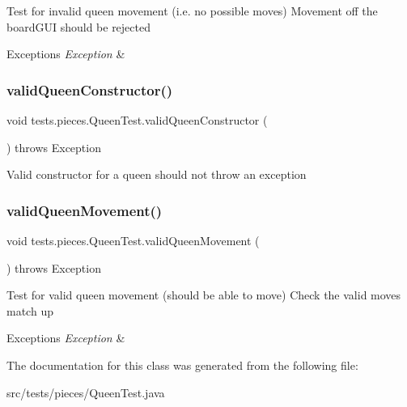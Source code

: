 Test for invalid queen movement (i.\+e. no possible moves) Movement off the board\+G\+UI should be rejected


\begin{DoxyExceptions}{Exceptions}
{\em Exception} & \\
\hline
\end{DoxyExceptions}
\hypertarget{classtests_1_1pieces_1_1_queen_test_ab765f13237fea1159b5830124489e0d0}{}\label{classtests_1_1pieces_1_1_queen_test_ab765f13237fea1159b5830124489e0d0} 
\subsubsection{\texorpdfstring{valid\+Queen\+Constructor()}{validQueenConstructor()}}
{\footnotesize\ttfamily void tests.\+pieces.\+Queen\+Test.\+valid\+Queen\+Constructor (\begin{DoxyParamCaption}{ }\end{DoxyParamCaption}) throws Exception}

Valid constructor for a queen should not throw an exception \hypertarget{classtests_1_1pieces_1_1_queen_test_a286f0f2d69087f9fbeb0cb738c9768c5}{}\label{classtests_1_1pieces_1_1_queen_test_a286f0f2d69087f9fbeb0cb738c9768c5} 
\subsubsection{\texorpdfstring{valid\+Queen\+Movement()}{validQueenMovement()}}
{\footnotesize\ttfamily void tests.\+pieces.\+Queen\+Test.\+valid\+Queen\+Movement (\begin{DoxyParamCaption}{ }\end{DoxyParamCaption}) throws Exception}

Test for valid queen movement (should be able to move) Check the valid moves match up


\begin{DoxyExceptions}{Exceptions}
{\em Exception} & \\
\hline
\end{DoxyExceptions}


The documentation for this class was generated from the following file\+:\begin{DoxyCompactItemize}
\item 
src/tests/pieces/Queen\+Test.\+java\end{DoxyCompactItemize}
